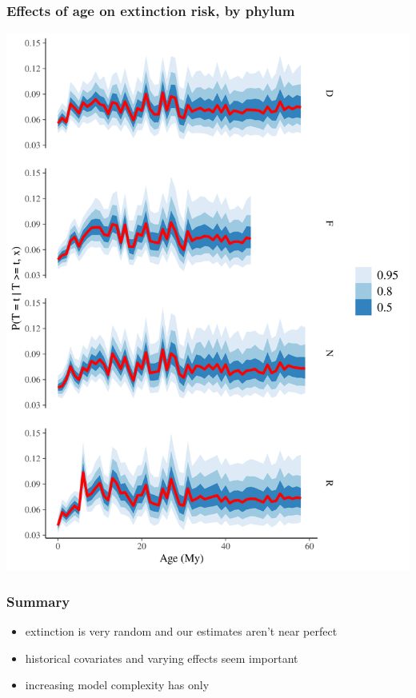 \documentclass{beamer}
\begin{document}
\begin{frame}
  \frametitle{Effects of age on extinction risk, by phylum}
  
  \includegraphics[width=\textwidth,height=\textheight,keepaspectratio=true]{../results/figure/hazard_bygroup}

\end{frame}


\begin{frame}
  \frametitle{Summary}

  \begin{itemize}
    \item extinction is very random and our estimates aren't near perfect
    \item historical covariates and varying effects seem important
    \item increasing model complexity has only 
  \end{itemize}

\end{frame}
\end{document}

